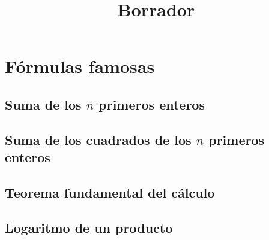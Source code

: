 \documentclass{article}
\author{}
\date{}
\title{Borrador}
\begin{document}
\maketitle


\begin{abstract}

\end{abstract}

\section{F\'ormulas famosas}

\subsection{Suma de los $n$ primeros enteros}


\subsection{Suma de los cuadrados de los $n$ primeros enteros}


\subsection{Teorema fundamental del cálculo}


\subsection{Logaritmo de un producto}
\end{document}

